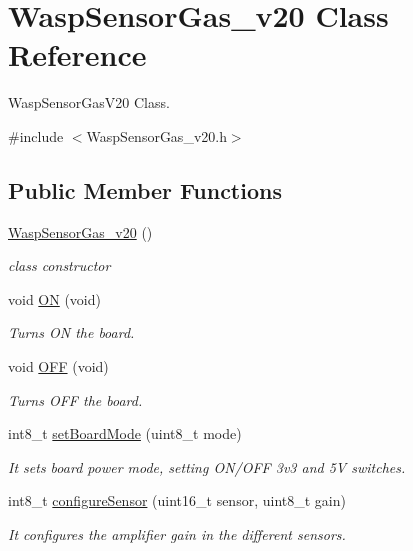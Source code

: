 \hypertarget{class_wasp_sensor_gas__v20}{}\section{Wasp\+Sensor\+Gas\+\_\+v20 Class Reference}
\label{class_wasp_sensor_gas__v20}


Wasp\+Sensor\+Gas\+V20 Class.  




{\ttfamily \#include $<$Wasp\+Sensor\+Gas\+\_\+v20.\+h$>$}

\subsection*{Public Member Functions}
\begin{DoxyCompactItemize}
\item 
\hyperlink{class_wasp_sensor_gas__v20_a6c498bdc384ea7349d77ae1495bf0f59}{Wasp\+Sensor\+Gas\+\_\+v20} ()
\begin{DoxyCompactList}\small\item\em class constructor \end{DoxyCompactList}\item 
void \hyperlink{class_wasp_sensor_gas__v20_a38e471b3a08ff285e41655b8e0782957}{ON} (void)
\begin{DoxyCompactList}\small\item\em Turns ON the board. \end{DoxyCompactList}\item 
void \hyperlink{class_wasp_sensor_gas__v20_a97f04f61e46179555fde5f2f73eb41b5}{O\+FF} (void)
\begin{DoxyCompactList}\small\item\em Turns O\+FF the board. \end{DoxyCompactList}\item 
int8\+\_\+t \hyperlink{class_wasp_sensor_gas__v20_a07893b5dd0c8bd81b876bed9f35ec38e}{set\+Board\+Mode} (uint8\+\_\+t mode)
\begin{DoxyCompactList}\small\item\em It sets board power mode, setting O\+N/\+O\+FF 3v3 and 5V switches. \end{DoxyCompactList}\item 
int8\+\_\+t \hyperlink{class_wasp_sensor_gas__v20_a72406f1ae43a46a9c98e19b59ab2516a}{configure\+Sensor} (uint16\+\_\+t sensor, uint8\+\_\+t gain)
\begin{DoxyCompactList}\small\item\em It configures the amplifier gain in the different sensors. \end{DoxyCompactList}\item 

\end{DoxyCompactItemize}
